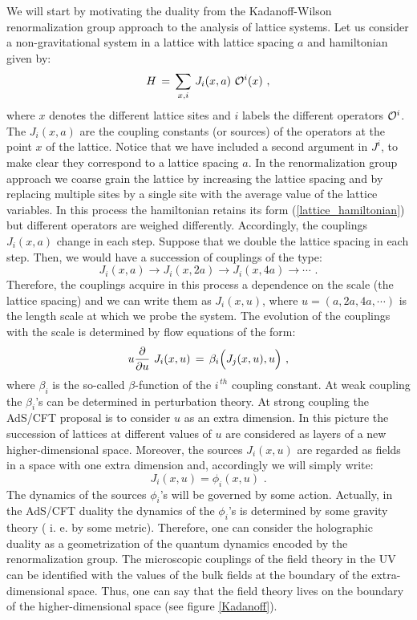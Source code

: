 \documentclass[12pt,notitlepage]{article}
\newcommand{\beq}{\begin{equation}}
\newcommand{\eeq}{\end{equation}}
\begin{document}
We will start by motivating the duality from the Kadanoff-Wilson renormalization group approach to the analysis of lattice systems. Let us consider a non-gravitational system in a lattice with lattice spacing $a$ and hamiltonian given by:
\beq
H\,=\,\sum_{x,i}\,J_i(x,a)\,\,{\cal O}^i(x)\,\,,
\label{lattice_hamiltonian}
\eeq
where $x$ denotes the different lattice sites and $i$ labels the different operators ${\cal O}^i$. The $J_i(x,a)$ are the coupling constants (or sources) of the operators at the point $x$ of the lattice. Notice that we have included a second argument in $J^i$, to make clear  they correspond to a lattice spacing $a$. In the renormalization group approach we coarse grain the lattice by increasing the lattice spacing and by replacing multiple sites by a single site with the average value of the lattice variables. In this process the hamiltonian retains its form (\ref{lattice_hamiltonian}) but different operators are weighed differently. Accordingly, the couplings $J_i(x,a)$ change in each step. Suppose that we double the lattice spacing in each step. Then, we would have a succession of couplings of the type:
\beq
J_i(x,a)\to J_i(x,2a)\to J_i(x,4a)\to\cdots\,\,.
\eeq
Therefore, the couplings acquire in this process a dependence on the scale (the lattice spacing) and we can write them as $J_i(x,u)$, where $u=(a,2a,4a,\cdots)$ is the length scale at which we probe the system.  The evolution of the couplings with the scale is determined by flow equations of the form:
\beq
u{\partial \over \partial u}\,\,J_i(x,u)\,=\,
\beta_i\Big(J_j(x,u),u\Big)\,\,,
\eeq
where $\beta_i$ is the so-called $\beta$-function of the $i^{\,th}$ coupling constant. At weak coupling the  $\beta_i$'s  can be determined in perturbation theory. At strong coupling the AdS/CFT proposal is to consider $u$ as an extra dimension. In this picture the succession of lattices at different values of $u$ are considered as layers of a new higher-dimensional space. Moreover, the sources $J_i(x,u)$ are regarded as fields in a space with one extra dimension and, accordingly we will simply write:
\beq
J_i(x,u)=\phi_i(x,u)\,\,.
\eeq
The dynamics of the  sources $\phi_i$'s will be governed by some action. Actually, in the AdS/CFT duality the dynamics of the  $\phi_i$'s is determined by some gravity theory ( i. e. by some metric). Therefore, one can consider the holographic duality as a geometrization of the quantum dynamics encoded by the renormalization group. The microscopic couplings of the field theory in the UV can be identified with the values of the bulk fields at the boundary of the extra-dimensional space. Thus, one can say that the field theory lives on the boundary of the higher-dimensional space (see figure \ref{Kadanoff}). 
\end{document}
